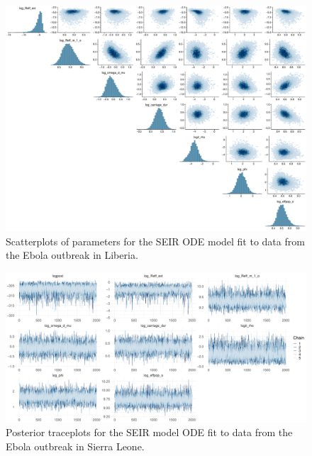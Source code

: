 \begin{figure}[htbp]
	\centering
	\includegraphics[width=\linewidth]{figures/lib_tight_pairs_ode}
	\caption{Scatterplots of parameters for the SEIR ODE model fit to data from the Ebola outbreak in Liberia.}
	\label{fig:liberiapairsode}
\end{figure}

\begin{figure}
	\centering
	\includegraphics[width=\linewidth]{figures/sln_tight_traces_ode}
	\caption{Posterior traceplots for the SEIR model ODE fit to data from the Ebola outbreak in Sierra Leone.}
	\label{fig:sierraleonetracesode}
\end{figure}

